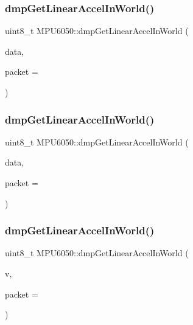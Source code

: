 \subsubsection{\texorpdfstring{dmpGetLinearAccelInWorld()}{dmpGetLinearAccelInWorld()}\hspace{0.1cm}{\footnotesize\ttfamily [1/4]}}
{\footnotesize\ttfamily uint8\+\_\+t M\+P\+U6050\+::dmp\+Get\+Linear\+Accel\+In\+World (\begin{DoxyParamCaption}\item[{int32\+\_\+t $\ast$}]{data,  }\item[{const uint8\+\_\+t $\ast$}]{packet = {} }\end{DoxyParamCaption})}

\mbox{\label{classMPU6050_a097673d9ae96274ab711aaef7827411d}} 
\subsubsection{\texorpdfstring{dmpGetLinearAccelInWorld()}{dmpGetLinearAccelInWorld()}\hspace{0.1cm}{\footnotesize\ttfamily [2/4]}}
{\footnotesize\ttfamily uint8\+\_\+t M\+P\+U6050\+::dmp\+Get\+Linear\+Accel\+In\+World (\begin{DoxyParamCaption}\item[{int16\+\_\+t $\ast$}]{data,  }\item[{const uint8\+\_\+t $\ast$}]{packet = {} }\end{DoxyParamCaption})}

\mbox{\label{classMPU6050_a848b210e89382c1f7c7fb3ee679b3852}} 
\subsubsection{\texorpdfstring{dmpGetLinearAccelInWorld()}{dmpGetLinearAccelInWorld()}\hspace{0.1cm}{\footnotesize\ttfamily [3/4]}}
{\footnotesize\ttfamily uint8\+\_\+t M\+P\+U6050\+::dmp\+Get\+Linear\+Accel\+In\+World (\begin{DoxyParamCaption}\item[{\mbox{\hyperlink{classVectorInt16}{Vector\+Int16}} $\ast$}]{v,  }\item[{const uint8\+\_\+t $\ast$}]{packet = {} }\end{DoxyParamCaption})}

